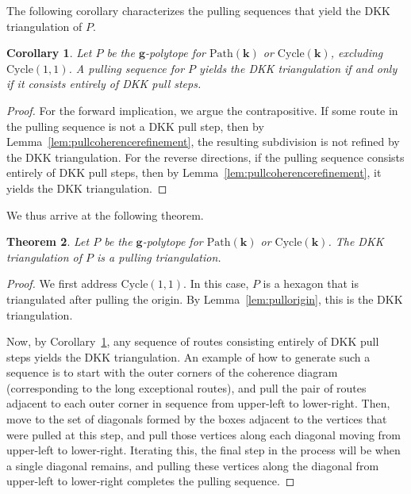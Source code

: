 \documentclass[12pt]{amsart}
\newtheorem{theorem}{Theorem}[section]
\newtheorem{corollary}[theorem]{Corollary}
\theoremstyle{definition}
\newcommand\bg{\mathbf{g}}
\newcommand\bk{\mathbf{k}}
\newcommand\Path{\mathrm{Path}}
\newcommand\Cycle{\mathrm{Cycle}}
\begin{document}
The following corollary characterizes the pulling sequences that yield the DKK triangulation of $P$.

\begin{corollary}\label{cor:characterizing-pull-coherent-routes}
    Let $P$ be the $\bg$-polytope for $\Path(\bk)$ or $\Cycle(\bk)$, excluding $\Cycle(1,1)$.
    A pulling sequence for $P$ yields the DKK triangulation if and only if it consists entirely of DKK pull steps.
\end{corollary}

\begin{proof}
For the forward implication, we argue the contrapositive. 
If some route in the pulling sequence is not a DKK pull step, then by Lemma~\ref{lem:pullcoherencerefinement}, the resulting subdivision is not refined by the DKK triangulation.
For the reverse directions, if the pulling sequence consists entirely of DKK pull steps, then by Lemma~\ref{lem:pullcoherencerefinement}, it yields the DKK triangulation.
\end{proof}

We thus arrive at the following theorem.

\begin{theorem}
    \label{thm:dkkpulling}
    Let $P$ be the $\bg$-polytope for $\Path(\bk)$ or $\Cycle(\bk)$.
    The DKK triangulation of $P$ is a pulling triangulation.
\end{theorem}

\begin{proof}
    We first address $\Cycle(1,1)$. In this case, $P$ is a hexagon that is triangulated after pulling the origin. By Lemma~\ref{lem:pullorigin}, this is the DKK triangulation.
    
    Now, by Corollary~\ref{cor:characterizing-pull-coherent-routes}, any sequence of routes consisting entirely of DKK pull steps yields the DKK triangulation.
    An example of how to generate such a sequence is to start with the outer corners of the coherence diagram (corresponding to the long exceptional routes), and pull the pair of routes adjacent to each outer corner in sequence from upper-left to lower-right.
    Then, move to the set of diagonals formed by the boxes adjacent to the vertices that were pulled at this step, and pull those vertices along each diagonal moving from upper-left to lower-right.
    Iterating this, the final step in the process will be when a single diagonal remains, and pulling these vertices along the diagonal from upper-left to lower-right completes the pulling sequence.
\end{proof}
\end{document}
